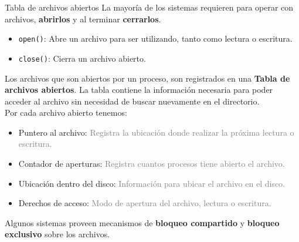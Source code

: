 \documentclass[aspectratio=169]{beamer}
\begin{document}
\begin{frame}[fragile,t]{Tabla de archivos abiertos}
    La mayoría de los sistemas requieren para operar con archivos, \textbf{abrirlos} y al terminar \textbf{cerrarlos}.\\
    \begin{itemize}
    \item \texttt{open()}: Abre un archivo para ser utilizando, tanto como lectura o escritura.
    \item \texttt{close()}: Cierra un archivo abierto.
    \end{itemize}
    \pause
    Los archivos que son abiertos por un proceso, son registrados en una \textbf{Tabla de archivos abiertos}.
    La tabla contiene la información necesaria para poder acceder al archivo sin necesidad de buscar nuevamente en el directorio.\\
    \bigskip
    \pause
    Por cada archivo abierto tenemos: { \small
    \begin{itemize}
    \setlength\itemsep{0px}
    \item Puntero al archivo: \textcolor{gray}{Registra la ubicación donde realizar la próxima lectura o escritura.}
    \item Contador de aperturas: \textcolor{gray}{Registra cuantos procesos tiene abierto el archivo.}
    \item Ubicación dentro del disco: \textcolor{gray}{Información para ubicar el archivo en el disco.}
    \item Derechos de acceso: \textcolor{gray}{Modo de apertura del archivo, lectura o escritura.}
    \end{itemize} }
    \small Algunos sistemas proveen mecanismos de \textbf{bloqueo compartido} y \textbf{bloqueo exclusivo} sobre los archivos.
\end{frame}
\end{document}
